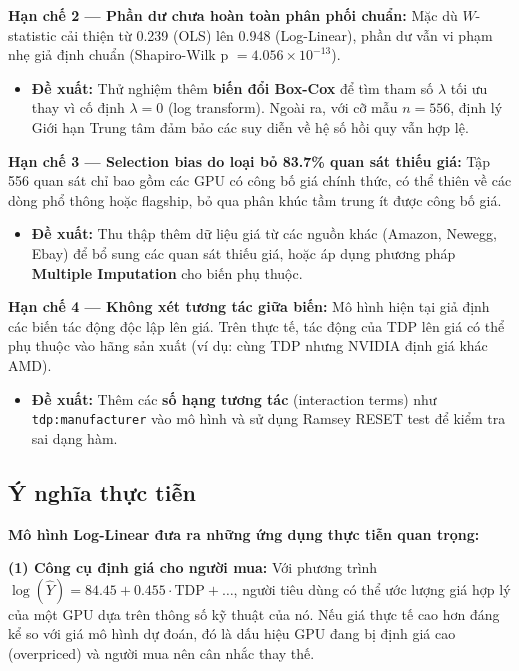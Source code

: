 \documentclass[a4paper]{article}
\begin{document}
\textbf{Hạn chế 2 --- Phần dư chưa hoàn toàn phân phối chuẩn:} Mặc dù $W$-statistic cải thiện từ 0.239 (OLS) lên 0.948 (Log-Linear), phần dư vẫn vi phạm nhẹ giả định chuẩn (Shapiro-Wilk p $= 4.056 \times 10^{-13}$).
\begin{itemize}
    \item \textbf{Đề xuất:} Thử nghiệm thêm \textbf{biến đổi Box-Cox} để tìm tham số $\lambda$ tối ưu thay vì cố định $\lambda = 0$ (log transform). Ngoài ra, với cỡ mẫu $n = 556$, định lý Giới hạn Trung tâm đảm bảo các suy diễn về hệ số hồi quy vẫn hợp lệ.
\end{itemize}

\textbf{Hạn chế 3 --- Selection bias do loại bỏ 83.7\% quan sát thiếu giá:} Tập 556 quan sát chỉ bao gồm các GPU có công bố giá chính thức, có thể thiên về các dòng phổ thông hoặc flagship, bỏ qua phân khúc tầm trung ít được công bố giá.
\begin{itemize}
    \item \textbf{Đề xuất:} Thu thập thêm dữ liệu giá từ các nguồn khác (Amazon, Newegg, Ebay) để bổ sung các quan sát thiếu giá, hoặc áp dụng phương pháp \textbf{Multiple Imputation} cho biến phụ thuộc.
\end{itemize}

\textbf{Hạn chế 4 --- Không xét tương tác giữa biến:} Mô hình hiện tại giả định các biến tác động độc lập lên giá. Trên thực tế, tác động của TDP lên giá có thể phụ thuộc vào hãng sản xuất (ví dụ: cùng TDP nhưng NVIDIA định giá khác AMD).
\begin{itemize}
    \item \textbf{Đề xuất:} Thêm các \textbf{số hạng tương tác} (interaction terms) như \texttt{tdp:manufacturer} vào mô hình và sử dụng Ramsey RESET test để kiểm tra sai dạng hàm.
\end{itemize}

\subsection{Ý nghĩa thực tiễn}

\textbf{Mô hình Log-Linear đưa ra những ứng dụng thực tiễn quan trọng:}

\textbf{(1) Công cụ định giá cho người mua:} Với phương trình $\log(\hat{Y}) = 84.45 + 0.455 \cdot \text{TDP} + \ldots$, người tiêu dùng có thể ước lượng giá hợp lý của một GPU dựa trên thông số kỹ thuật của nó. Nếu giá thực tế cao hơn đáng kể so với giá mô hình dự đoán, đó là dấu hiệu GPU đang bị định giá cao (overpriced) và người mua nên cân nhắc thay thế.
\end{document}
